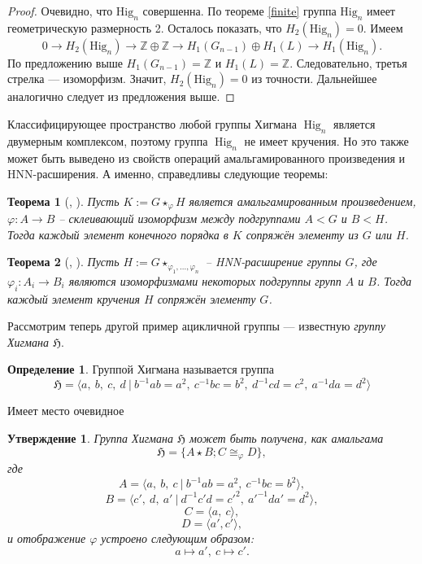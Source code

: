 \documentclass[14pt, dvipsnames]{extarticle}
\newtheorem{theorem}{Теорема}
\newtheorem{statement}{Утверждение}
\theoremstyle{definition}
\newtheorem{defi}{Определение}
\theoremstyle{remark}
\DeclareMathOperator{\Hig}{\mathrm{Hig}}
\begin{document}
\begin{proof}
Очевидно, что $\mathrm{Hig}_n$ совершенна. По теореме \ref{finite} группа $\mathrm{Hig}_n$ имеет геометрическую размерность 2. Осталось показать, что $H_2(\mathrm{Hig}_n)=0$. Имеем $$0\to H_2(\mathrm{Hig}_n)\to \mathbb{Z}\oplus\mathbb{Z}\to H_1(G_{n-1})\oplus H_{1}(L)\to H_1(\mathrm{Hig}_n).$$ По предложению выше $H_1(G_{n-1})=\mathbb{Z}$ и $H_1(L)=\mathbb{Z}$. Следовательно, третья стрелка --- изоморфизм. Значит, $H_2(\mathrm{Hig}_n)=0$ из точности. Дальнейшее аналогично следует из предложения выше.
\end{proof}

Классифицирующее пространство любой группы Хигмана $\Hig_n$ является двумерным комплексом, поэтому группа $\Hig_n$ не имеет кручения. Но это также может быть выведено из свойств операций амальгамированного произведения и HNN-расширения. А именно, справедливы следующие теоремы:

\begin{theorem}[\cite{Magnus}, \cite{Serre}]
Пусть $K:= G\star_\varphi H$ является амальгамированным произведением, $\varphi: A\to B$ -- склеивающий изоморфизм между подгруппами $A < G$ и $B < H$. Тогда каждый элемент конечного порядка в $K$ сопряжён элементу из $G$ или $H$.
\end{theorem}

\begin{theorem}[\cite{Magnus}, \cite{Serre}]
Пусть $H:= G\star_{\varphi_1, ..., \varphi_n}$ -- HNN-расширение группы $G$, где $\varphi_i: A_i\to B_i$ являются изоморфизмами некоторых подгруппы групп $A$ и $B$. Тогда каждый элемент кручения $H$ сопряжён элементу $G$.
\end{theorem}












\iffalse

Рассмотрим теперь другой пример ацикличной группы --- известную {\it группу Хигмана $\mathfrak{H}$}.

\begin{defi}
Группой Хигмана называется группа $$\mathfrak{H}=\langle a,\ b,\ c,\ d\ |\ b^{-1}ab=a^2,\ c^{-1}bc=b^2,\ d^{-1}cd=c^2,\ a^{-1}da=d^2 \rangle$$
\end{defi}

Имеет место очевидное

\begin{statement}
Группа Хигмана $\mathfrak{H}$ может быть получена, как амальгама $$\mathfrak{H}=\{ A\star B; C\cong_\varphi D\},$$ где $$A=\langle a,\  b,\ c\ |\ b^{-1}ab=a^2,\ c^{-1}bc=b^2  \rangle,$$ $$B=\langle c',\ d,\ a'\ |\ d^{-1}c'd=c'^2,\ a'^{-1}da'=d^2\rangle,$$ $$C=\langle a,\ c\rangle,$$ $$D=\langle a', c' \rangle,$$ и отображение $\varphi$ устроено следующим образом: $$a\mapsto a',\ c\mapsto c'.$$
\end{statement}
\end{document}
